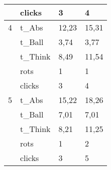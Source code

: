 \begin{tabular}{|c|l|ll|}
    \rowcolor[rgb]{ .851,  .851,  .851}       & clicks & \cellcolor[rgb]{ 1,  1,  1}3 & \cellcolor[rgb]{ 1,  1,  1}4 \bigstrut[b]\\
    \hline
    \rowcolor[rgb]{ .851,  .851,  .851} 4     & t\_Abs & \cellcolor[rgb]{ 1,  1,  1}12,23 & \cellcolor[rgb]{ 1,  1,  1}15,31 \bigstrut[t]\\
    \rowcolor[rgb]{ .851,  .851,  .851}       & t\_Ball & \cellcolor[rgb]{ 1,  1,  1}3,74 & \cellcolor[rgb]{ 1,  1,  1}3,77 \\
    \rowcolor[rgb]{ .851,  .851,  .851}       & t\_Think & \cellcolor[rgb]{ 1,  1,  1}8,49 & \cellcolor[rgb]{ 1,  1,  1}11,54 \\
    \rowcolor[rgb]{ .851,  .851,  .851}       & rots  & \cellcolor[rgb]{ 1,  1,  1}1 & \cellcolor[rgb]{ 1,  1,  1}1 \\
    \rowcolor[rgb]{ .851,  .851,  .851}       & clicks & \cellcolor[rgb]{ 1,  1,  1}3 & \cellcolor[rgb]{ 1,  1,  1}4 \bigstrut[b]\\
    \hline
    \rowcolor[rgb]{ .851,  .851,  .851} 5     & t\_Abs & \cellcolor[rgb]{ 1,  1,  1}15,22 & \cellcolor[rgb]{ 1,  1,  1}18,26 \bigstrut[t]\\
    \rowcolor[rgb]{ .851,  .851,  .851}       & t\_Ball & \cellcolor[rgb]{ 1,  1,  1}7,01 & \cellcolor[rgb]{ 1,  1,  1}7,01 \\
    \rowcolor[rgb]{ .851,  .851,  .851}       & t\_Think & \cellcolor[rgb]{ 1,  1,  1}8,21 & \cellcolor[rgb]{ 1,  1,  1}11,25 \\
    \rowcolor[rgb]{ .851,  .851,  .851}       & rots  & \cellcolor[rgb]{ 1,  1,  1}1 & \cellcolor[rgb]{ 1,  1,  1}2 \\
    \rowcolor[rgb]{ .851,  .851,  .851}       & clicks & \cellcolor[rgb]{ 1,  1,  1}3 & \cellcolor[rgb]{ 1,  1,  1}5 \bigstrut[b]\\
    \hline
    \end{tabular}%

